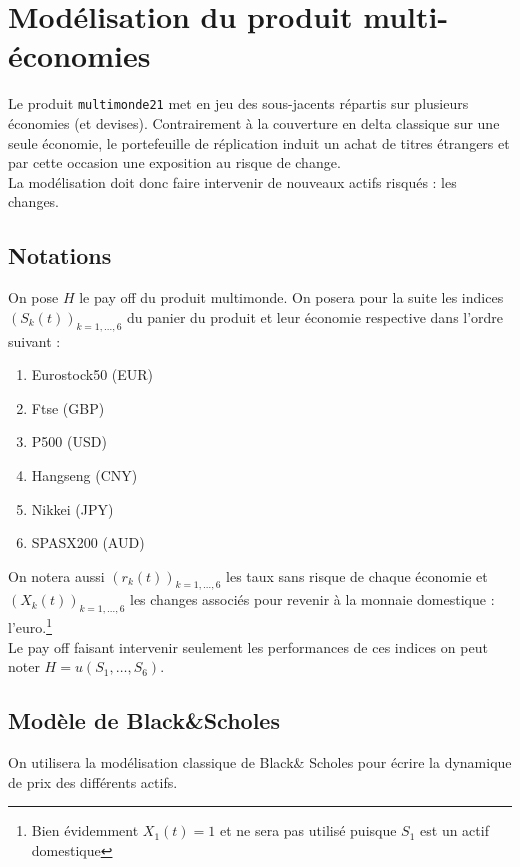 \documentclass[a4paper,12pt]{article}
\begin{document}
\section{Modélisation du produit multi-économies}
Le produit {\tt multimonde21} met en jeu des sous-jacents répartis sur plusieurs économies (et devises). Contrairement à la couverture en delta classique sur une seule économie, le portefeuille de réplication induit un achat de titres étrangers et par cette occasion une exposition au risque de change. \\
La modélisation doit donc faire intervenir de nouveaux actifs risqués : les changes.
\subsection{Notations}
On pose $H$ le pay off du produit multimonde.
On posera pour la suite les indices $(S_k(t))_{k=1,\ldots,6}$ du panier du produit et leur économie respective dans l'ordre suivant : 
\begin{enumerate}
\item Eurostock50 (EUR)
\item Ftse (GBP)
\item P500 (USD)
\item Hangseng (CNY)
\item Nikkei (JPY)
\item SPASX200 (AUD)
\end{enumerate}
On notera aussi $(r_k(t))_{k=1,\ldots,6}$ les taux sans risque de chaque économie et $(X_k(t))_{k=1,\ldots,6}$ les changes associés pour revenir à la monnaie domestique : l'euro.\footnote{Bien évidemment $X_1(t)=1$ et ne sera pas utilisé puisque $S_1$ est un actif domestique} \\[2mm]
Le pay off faisant intervenir seulement les performances de ces indices on peut noter $H=u(S_1,\ldots,S_6)$.
\subsection{Modèle de Black\&Scholes}
On utilisera la modélisation classique de Black\& Scholes pour écrire la dynamique de prix des différents actifs. 
\end{document}
